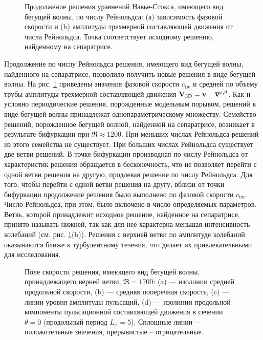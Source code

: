 \begin{figure}
\caption{Продолжение решения уравнений Навье-Стокса, имеющего вид бегущей волны, по числу Рейнольдса: (а) зависимость фазовой скорости и (b) амплитуды трехмерной составляющей движения от числа Рейнольдса. Точка соответствует исходному решению, найденному на сепаратрисе.} 
\label{pipeTW_contin_pic}
\end{figure}

Продолжение по числу Рейнольдса решения, имеющего вид бегущей волны, найденного на сепаратрисе, позволило получить новые решения в виде бегущей волны. На рис. \ref{pipeTW_contin_pic} приведены значения фазовой скорости $c_\mathrm{tw}$ и средней по объему трубы амплитуды трехмерной составляющей движения $\mathbf{V}_\mathrm{3D} = \mathbf{v} - \overline{\mathbf{v}}^{x,\theta}$. Как и условно периодические решения, порожденные модельным порывом, решений в виде бегущей волны принадлежат однопараметрическому множеству. Семейство решений, порожденное бегущей волной, найденной на сепаратрисе, возникает в результате бифуркации при $\Re \approx 1200$. При меньших числах Рейнольдса решений из этого семейства не существует. При больших числах Рейнольдса существует две ветви решений. В точке бифуркации производная по числу Рейнольдса от характеристик решения обращается в бесконечность, что не позволяет перейти с одной ветви решения на другую, продлевая решение по числу Рейнольдса. Для того, чтобы перейти с одной ветви решения на другу, вблизи от точки бифуркации продолжение решения было выполнено по фазовой скорости $c_\mathrm{tw}$. Число Рейнольдса, при этом, было включено в число определяемых параметров. Ветвь, которой принадлежит исходное решение, найденное на сепаратрисе, принято называть нижней, так как для нее характерна меньшая интенсивность колебаний (см. рис. \ref{pipeTW_contin_pic}(b)). Решения с верхней ветви по амплитуде колебаний оказываются ближе к турбулентному течения, что делает их привлекательными для исследования. 

\begin{figure}
\caption{Поле скорости решения, имеющего вид бегущей волны, принадлежащего верней ветви, $\Re = 1700$: (a) --- изолинии средней продольной скорости, (b) --- средняя поперечная скорость, (c) --- линии уровня амплитуды пульсаций, (d) --- изолинии продольной компоненты пульсационной составляющей движения в сечении $\theta = 0$ (продольный период $L_x = 5$). Сплошные линии --- положительные значения, прерывистые -- отрицательные. } 
\label{pipeTWub_means_pic}
\end{figure}

